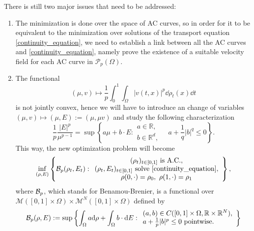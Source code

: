 There is still two major issues that need to be addressed:
\begin{enumerate}
	\item The minimization is done over the space of AC curves, so in order for it to be equivalent to the minimization over solutions of the transport equation \eqref{continuity_equation}, we need to establish a link between all the AC curves and \eqref{continuity_equation}, namely prove the existence of a suitable velocity field for each AC curve in $\mathcal{P}_p(\Omega)$.  
	\item The functional 
	$$
	(\mu, v) \mapsto \frac{1}{p}\int_0^1\int_{\Omega}\left|v(t,x)\right|^p \dd \rho_t(x)\dd t
	$$
	is not jointly convex, hence we will have to introduce an change of variables $(\mu, v)\mapsto (\mu, E):= (\mu, \mu v)$ and study the following characterization 
	\begin{equation*}
	\frac{1}{p}\frac{|E|^p}{\mu^{p-1}} = \sup 
	\left\{
	a\mu + b\cdot E: 
	\begin{array}{c}
	a \in \mathbb{R},\\
	b \in \mathbb{R}^d,
	\end{array}
	\quad 
	a +\frac{1}{q}|b|^q \le 0
	\right\}.
	\end{equation*} 
	This way, the new optimization problem will become 
	\begin{equation*}
	\mathop{\rm inf}_{(\rho, E)}
	\left\{
	\mathcal{B}_p(\rho_t, E_t): 
	\begin{array}{c}
	(\rho_t)_{t \in [0,1]} \text{ is A.C.}, \\
	(\rho_t, E_t)_{t \in [0,1]} \text{ solve \eqref{continuity_equation}},\\
	\rho(0,\cdot) = \rho_0, \ \rho(1, \cdot) = \rho_1 
	\end{array}
	\right\}, 
	\end{equation*}
	where $\mathcal{B}_p$, which stands for Benamou-Brenier, is a  functional over $\mathcal{M}\left([0,1]\times\Omega\right)\times \mathcal{M}^N\left([0,1]\times\Omega\right)$ defined by 
	\begin{equation*}
	\mathcal{B}_p(\rho, E):= \sup
	\left\{
	\int_{\Omega}a{\rm d} \rho + \int_{\Omega} b\cdot {\rm d} E:
	\begin{array}{l}
	(a,b) \in C([0,1]\times\Omega, \mathbb{R}\times \mathbb{R}^N),\\
	a + \frac{1}{p}|b|^p \le 0 \text{ pointwise.}
	\end{array}
	\right\}
	\end{equation*}
\end{enumerate} 

